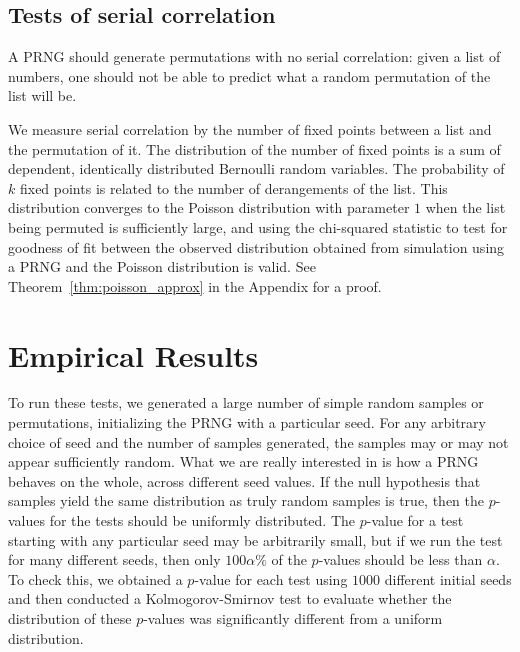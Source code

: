 \documentclass[12pt]{article}
\newcommand{\todo}[1]{{\color{red}{TO DO: \sc #1}}}
\begin{document}
\subsection{Tests of serial correlation}

A PRNG should generate permutations with no serial correlation:
given a list of numbers, one should not be able to predict what a random permutation of the list will be.

We measure serial correlation by the number of fixed points between a list and the permutation of it. 
The distribution of the number of fixed points is a sum of dependent, identically distributed Bernoulli random variables.
The probability of $k$ fixed points is related to the number of derangements of the list.
This distribution converges to the Poisson distribution with parameter $1$ when the list being permuted is sufficiently large,
and using the chi-squared statistic to test for goodness of fit between the observed distribution obtained from simulation using a PRNG and the Poisson distribution is valid.
See Theorem~\ref{thm:poisson_approx} in the Appendix for a proof.


\section{Empirical Results}\label{sec:results}


\todo{we used MT and my SHA256 prototype in Python. Describe the SHA256 PRNG in greater detail and point to where it can be downloaded}

To run these tests, we generated a large number of simple random samples or permutations, initializing the PRNG with a particular seed. 
For any arbitrary choice of seed and the number of samples generated, the samples may or may not appear sufficiently random. 
What we are really interested in is how a PRNG behaves on the whole, across different seed values.
If the null hypothesis that samples yield the same distribution as truly random samples is true, then the $p$-values for the tests should be uniformly distributed. 
The $p$-value for a test starting with any particular seed may be arbitrarily small, but if we run the test for many different seeds, then only $100 \alpha \%$ of the $p$-values should be less than $\alpha$.
To check this, we obtained a $p$-value for each test using $1000$ different initial seeds and then conducted a Kolmogorov-Smirnov test to evaluate whether the distribution of these $p$-values was significantly different from a uniform distribution.
\end{document}
